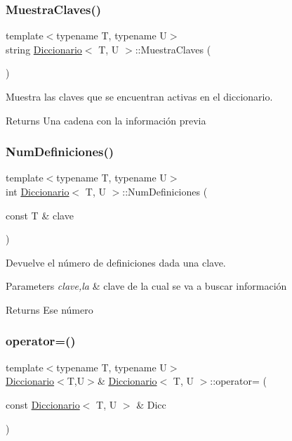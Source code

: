 \subsubsection{\texorpdfstring{Muestra\+Claves()}{MuestraClaves()}}
{\footnotesize\ttfamily template$<$typename T, typename U$>$ \\
string \hyperlink{classDiccionario}{Diccionario}$<$ T, U $>$\+::Muestra\+Claves (\begin{DoxyParamCaption}{ }\end{DoxyParamCaption})}



Muestra las claves que se encuentran activas en el diccionario. 

\begin{DoxyReturn}{Returns}
Una cadena con la información previa 
\end{DoxyReturn}
\mbox{\label{classDiccionario_a7b54f13ef7e98a6cf3c9e2329d7c5cc7}} 
\subsubsection{\texorpdfstring{Num\+Definiciones()}{NumDefiniciones()}}
{\footnotesize\ttfamily template$<$typename T, typename U$>$ \\
int \hyperlink{classDiccionario}{Diccionario}$<$ T, U $>$\+::Num\+Definiciones (\begin{DoxyParamCaption}\item[{const T \&}]{clave }\end{DoxyParamCaption})}



Devuelve el número de definiciones dada una clave. 


\begin{DoxyParams}{Parameters}
{\em clave,la} & clave de la cual se va a buscar información \\
\hline
\end{DoxyParams}
\begin{DoxyReturn}{Returns}
Ese número 
\end{DoxyReturn}
\mbox{\label{classDiccionario_a8ddaa4d3ff7ae725feaecc47a386094b}} 
\subsubsection{\texorpdfstring{operator=()}{operator=()}}
{\footnotesize\ttfamily template$<$typename T, typename U$>$ \\
\hyperlink{classDiccionario}{Diccionario}$<$T,U$>$\& \hyperlink{classDiccionario}{Diccionario}$<$ T, U $>$\+::operator= (\begin{DoxyParamCaption}\item[{const \hyperlink{classDiccionario}{Diccionario}$<$ T, U $>$ \&}]{Dicc }\end{DoxyParamCaption})}



